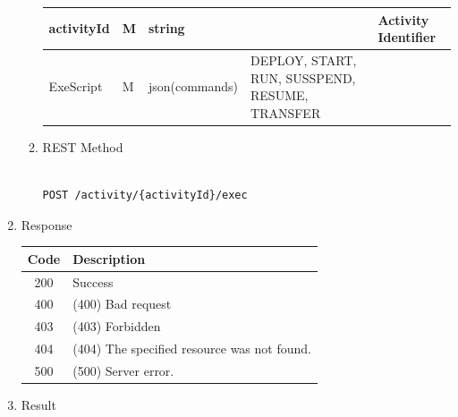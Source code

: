 \begin{enumerate}
\begin{enumerate}
\begin{table}[H]
\begin{center}
\begin{tabular}{|p{3cm}|l|p{3cm}|p{3cm}|p{4cm}|}
activityId				& M	& 	string				&			&	Activity Identifier \\ 
\hline

ExeScript				& M	& 	json(commands)		&	DEPLOY, START, RUN, SUSSPEND, RESUME, TRANSFER	&	 \\ 
\hline


\end{tabular}
\end{center}
\end{table}


\item REST Method

\begin{tcolorbox}[boxrule=0pt, frame empty]
\begin{verbatim} 

POST /activity/{activityId}/exec

\end{verbatim}
\end{tcolorbox}

\end{enumerate}

\item Response

\begin{table}[H]
\footnotesize

\begin{center}
\begin{tabular}{|c|l|} 
\hline
\rowcolor{lightgray}	Code 		& 	Description \\
\hline
200	 		&	Success \\
\hline
400			&	(400) Bad request \\
\hline
403			&	(403) Forbidden	\\
\hline
404			&	(404) The specified resource was not found. \\
\hline
500			&	(500) Server error. \\
\hline
\end{tabular}
\end{center}
\end{table}

\item Result

\begin{tcolorbox}[boxrule=0pt, frame empty]
\begin{verbatim}


\end{verbatim}
\end{tcolorbox}
\end{enumerate}
